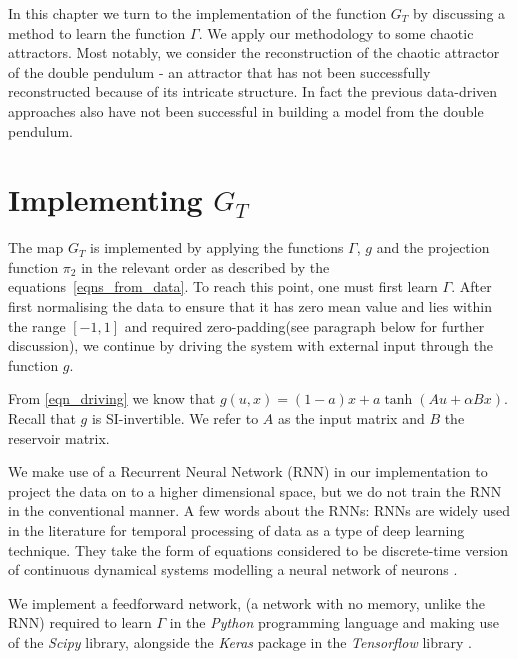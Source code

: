 In this chapter we turn to the implementation of the function $G_T$ by discussing a method to learn the function $\Gamma$. We apply our methodology to some chaotic attractors. Most notably, we consider the reconstruction of the chaotic attractor of the double pendulum - an  attractor that has not been successfully reconstructed because of its intricate structure. In fact the previous data-driven approaches also have not been successful in building a model from the double pendulum. 




\section{Implementing $G_T$}
The map $G_T$ is implemented by applying the functions $\Gamma$, $g$ and the projection function $\pi_2$ in the relevant order as described by the equations~\ref{eqns_from_data}. To reach this point, one must first learn $\Gamma$.
After first normalising the data to ensure that it has zero mean value and lies within the range $[-1,1]$ and required zero-padding(see paragraph below for further discussion), we continue by driving the system with external input through the function $g$.

From \eqref{eqn_driving} we know that $g(u,x) = (1-a) x + a \tanh(Au + \alpha B x)$. Recall that $g$ is SI-invertible. We refer to $A$ as the input matrix and $B$ the reservoir matrix. 

We make use of a Recurrent Neural Network (RNN) in our implementation to project the data on to a higher dimensional space, but we do not train the RNN in the conventional manner.  A few words about the RNNs: RNNs are widely used in the literature for temporal processing of data as a type of deep learning technique. They take the form of equations considered to be discrete-time version of continuous dynamical systems modelling a neural network of neurons \cite{jaeger2001echo}.

We implement a feedforward network, (a network with no memory, unlike the RNN) required to learn $\Gamma$ in the \emph{Python} programming language and making use of the \emph{Scipy} library, alongside the \emph{Keras} package in the \emph{Tensorflow} library .

